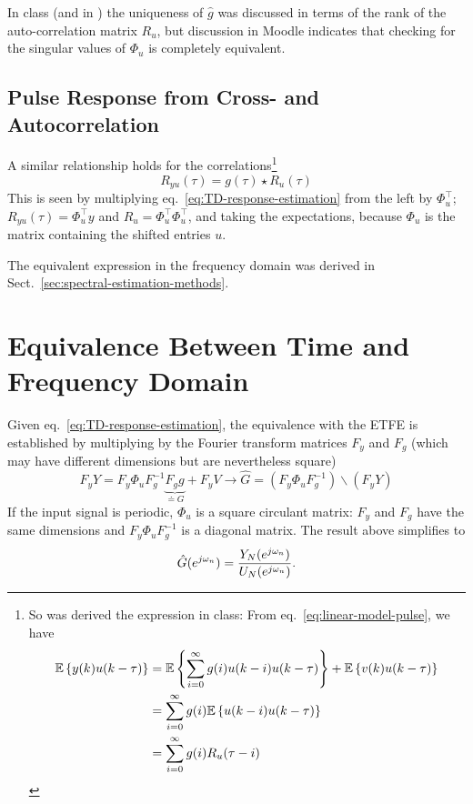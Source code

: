 In class (and in \cite[Sect.~13.2]{ljung}) the uniqueness of $\hat{g}$ was discussed in terms of the rank of the auto-correlation matrix $R_u$, but discussion in Moodle indicates that checking for the singular values of $\Phi_u$ is completely equivalent.

\subsection{Pulse Response from Cross- and Autocorrelation}
\label{sec:}

A similar relationship holds for the correlations\footnote{So was derived the expression in class: From eq.~\eqref{eq:linear-model-pulse}, we have
  \begin{align*}
    \mathbb{E}\left\{y(k)u(k-\tau)\right\} &= \mathbb{E}\left\{\sum_{i=0}^\infty g(i)u(k-i)u(k-\tau)\right\} + \mathbb{E}\left\{v(k)u(k-\tau)\right\} \\
                       &= \sum_{i=0}^\infty g(i) \mathbb{E}\left\{u(k-i)u(k-\tau)\right\} \\
                       &= \sum_{i=0}^\infty g(i) R_u(\tau-i)
  \end{align*}
}
\begin{equation*}
  R_{yu}(\tau) = g(\tau) \star R_u(\tau)
\end{equation*}
This is seen by multiplying eq.~\eqref{eq:TD-response-estimation} from the left by $\Phi_u^\top$; $R_{yu}(\tau) = \Phi_u^\top y$ and $R_u =\Phi_u^\top \Phi_u^\top$, and taking the expectations, because $\Phi_u$ is the matrix containing the shifted entries $u$.

The equivalent expression in the frequency domain was derived in Sect.~\ref{sec:spectral-estimation-methods}.


\section{Equivalence Between Time and Frequency Domain}
\label{sec:equivalence-time-freq-domain}

Given eq.~\eqref{eq:TD-response-estimation}, the equivalence with the ETFE is established by multiplying by the Fourier transform matrices $F_y$ and $F_g$ (which may have different dimensions but are nevertheless square)
\begin{equation}
  \label{eq:}
  F_yY = F_y\Phi_uF_g^{-1}\underbrace{F_gg}_{\doteq G} + F_yV \longrightarrow \hat{G} = \left(F_y\Phi_uF_g^{-1}\right) \backslash \left(F_yY\right)
\end{equation}
If the input signal is periodic, $\Phi_u$ is a square circulant matrix: $F_y$ and $F_g$ have the same dimensions and $F_y\Phi_uF_g^{-1}$ is a diagonal matrix. The result above simplifies to
\begin{equation*}
  \hat{G}(e^{j\omega_n}) = \frac{Y_N(e^{j\omega_n})}{U_N(e^{j\omega_n})}.
\end{equation*}

